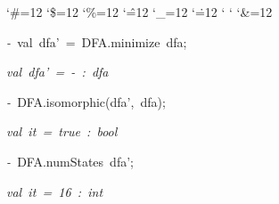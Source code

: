 \begin{list}{}
{\setlength{\leftmargin}{\leftmargini}
\setlength{\rightmargin}{0cm}
\setlength{\itemindent}{0cm}
\setlength{\listparindent}{0cm}
\setlength{\itemsep}{0cm}
\setlength{\parsep}{0cm}
\setlength{\labelsep}{0cm}
\setlength{\labelwidth}{0cm}
\catcode`\#=12
\catcode`\$=12
\catcode`\%=12
\catcode`\^=12
\catcode`\_=12
\catcode`\.=12
\catcode`
\catcode`
\catcode`\&=12
\ttfamily}
\small
\item[]\textsl{-\ }val\ dfa'\ =\ DFA.minimize\ dfa;
\item[]\textsl{val\ dfa'\ =\ -\ :\ dfa}
\item[]\textsl{-\ }DFA.isomorphic(dfa',\ dfa);
\item[]\textsl{val\ it\ =\ true\ :\ bool}
\item[]\textsl{-\ }DFA.numStates\ dfa';
\item[]\textsl{val\ it\ =\ 16\ :\ int}
\end{list}
